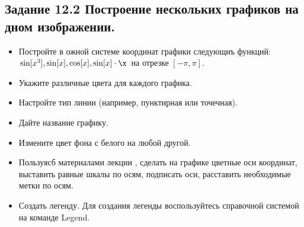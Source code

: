 \subsection*{\textbf{Задание 12.2} Построение нескольких графиков на дном изображении.}
\begin{itemize}
    \item Постройте в ожной системе координат графики следующиъ функций: $\sin[x^3], \sin[x], \cos[x], \sin[x]\cdot\x$ на отрезке $[-\pi,\pi]$.
    \item Укажите различные цвета для каждого графика.
    \item Настройте тип линии (например, пунктирная или точечная).
    \item Дайте название графику.
    \item Измените цвет фона с белого на любой другой.
    \item Пользуясб материалами лекции , сделать на графике цветные оси координат, выставить равные шкалы по осям,
    подписать оси, расставить необходимые метки по осям.
    \item Создать легенду.
    Для создания легенды воспользуйтесь справочной системой на команде Legend.
\end{itemize}

\begin{figure}[H]
    \renewcommand{\figurename}{Рисунок}
    \label{fig:image_12_2_1}
\end{figure}

\begin{figure}[H]
    \renewcommand{\figurename}{Рисунок}
    \label{fig:image_12_2_2}
\end{figure}